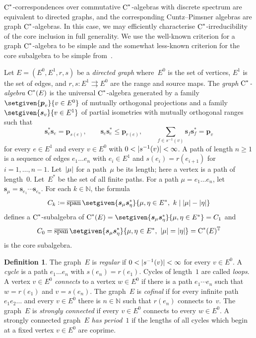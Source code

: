\documentclass[a4paper]{amsart}
\theoremstyle{plain}
\theoremstyle{definition}
\newtheorem{definition}[theorem]{Definition}
\theoremstyle{remark}
\numberwithin{theorem}{section}
\numberwithin{equation}{section}
\DeclareMathOperator*{\clsp}{\overline{span}} %
\newcommand*{\nb}{\nobreakdash}
\newcommand*{\N}{\mathbb N}
\newcommand*{\T}{\mathbb T}%
\newcommand*{\Cst}{\textup C^*}%
\newcommand*{\defeq}{\mathrel{\vcentcolon=}}%
\DeclarePairedDelimiter{\abs}{\lvert}{\rvert}%
\newcommand*{\sr}{s}%
\newcommand*{\rg}{r}%
\newcommand*{\su}{\boldsymbol{s}}
\newcommand*{\pu}{\boldsymbol{p}}
\begin{document}
\(\Cst\)\nb-correspondences over commutative \(\Cst\)\nb-algebras with
discrete spectrum are equivalent to directed graphs, and the
corresponding Cuntz--Pimsner algebras are graph \(\Cst\)\nb-algebras.
In this case, we may efficiently characterise
\(\Cst\)\nb-irreducibility of the core inclusion in full generality.
We use the well-known criterion for a graph \(\Cst\)\nb-algebra to be
simple and the somewhat less-known criterion for the core subalgebra
to be simple from~\cite{Pask-Rho:simple_graph_core}.

Let \(E = (E^0,E^1,\rg,\sr)\) be a \emph{directed graph} where~\(E^0\)
is the set of vertices, \(E^1\) is the set of edges, and \(\rg,\sr
\colon E^1 \rightrightarrows E^0\) are the range and source maps.
The \emph{graph \(\Cst\)\nb-algebra} \(\Cst(E)\) is the universal
\(\Cst\)\nb-algebra generated by a family \(\setgiven{\pu_v}{v\in
  E^0}\) of mutually orthogonal projections and a family
\(\setgiven{\su_v}{v\in E^1}\) of partial isometries with mutually
orthogonal ranges such that
\[
  \su_e^*\su_e=\pu_{\sr(e)},\qquad
  \su_e\su_e^*\le \pu_{\rg(e)}, \qquad
  \sum_{f\in \sr^{-1}(v)}\su_f\su_f^*=\pu_v
\]
for every \(e\in E^1\) and every \(v\in E^0\) with
\(0<\abs{\sr^{-1}(v)}<\infty\).
A path of length \(n\ge 1\) is a sequence of edges
\(e_1\ldots e_n\) with \(e_i \in E^1\) and \( \sr(e_i) =
\rg(e_{i+1})\) for \(i=1,\dotsc,n-1\).
Let~\(\abs{\mu}\) for a path~\(\mu\) be its length; here a vertex is a
path of length~\(0\).
Let~\(E^*\) be the set of all finite paths.
For a path \(\mu=e_1\ldots e_n\), let \(\su_{\mu}=\su_{e_1}\dotsm
\su_{e_n}\).
For each \(k\in \N\), the formula
\[
  C_k\defeq
  \clsp\setgiven{\su_{\mu}\su_{\eta}^*}
  {\mu,\eta\in E^*,\ k \mid \abs{\mu}-\abs{\eta}}
\]
defines a \(\Cst\)\nb-subalgebra of
\(\Cst(E)=\setgiven{\su_{\mu}\su_{\eta}^*}{\mu,\eta\in E^*}=C_1\) and
\[
  C_0=\clsp\setgiven{\su_{\mu}\su_{\eta}^*}
  {\mu,\eta\in E^*,\ \abs{\mu}=\abs{\eta}}
  = \Cst(E)^\T
\]
is the core subalgebra.

\begin{definition}
  The graph~\(E\) is \emph{regular} if
  \(0<\abs{\sr^{-1}(v)}<\infty\) for every \(v\in E^0\).
  A \emph{cycle} is a path \(e_1\ldots e_n\) with \(\sr(e_n)=\rg(e_1)\).
  Cycles of length~\(1\) are called \emph{loops}.
  A vertex \(v\in E^0\) \emph{connects} to a vertex \(w\in E^0\) if
  there is a path \(e_1\cdots e_n\) such that \(w=\rg(e_1)\) and
  \(v=\sr(e_n)\).
  The graph~\(E\) is \emph{cofinal} if for every infinite path
  \(e_1e_2\ldots\) and every \(v\in E^0\) there is \(n\in \N\) such
  that \(\rg(e_n)\) connects to~\(v\).
  The graph~\(E\) is \emph{strongly connected} if every \(v\in E^0\)
  connects to every \(w\in E^0\).
  A strongly connected graph~\(E\) \emph{has period~\(1\)} if the
  lengths of all cycles which begin at a fixed vertex \(v\in E^0\) are
  coprime.
\end{definition}
\end{document}
